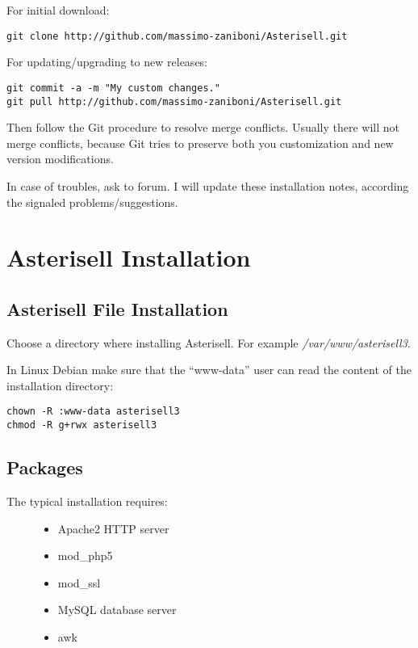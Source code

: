 \documentclass[letterpaper,10pt,english]{sphinxmanual}
\begin{document}
For initial download:

\begin{Verbatim}[commandchars=@\[\]]
git clone http://github.com/massimo-zaniboni/Asterisell.git
\end{Verbatim}

For updating/upgrading to new releases:

\begin{Verbatim}[commandchars=@\[\]]
git commit -a -m "My custom changes."
git pull http://github.com/massimo-zaniboni/Asterisell.git
\end{Verbatim}

Then follow the Git procedure to resolve merge conflicts. Usually there will not merge conflicts, because Git tries to preserve both you customization and new version modifications.

In case of troubles, ask to forum. I will update these installation notes, according the signaled problems/suggestions.


\section{Asterisell Installation}
\label{index:asterisell-installation}

\subsection{Asterisell File Installation}
\label{index:asterisell-file-installation}
Choose a directory where installing Asterisell. For example \emph{/var/www/asterisell3}.

In Linux Debian make sure that the ``www-data'' user can read the content of the installation directory:

\begin{Verbatim}[commandchars=@\[\]]
chown -R :www-data asterisell3
chmod -R g+rwx asterisell3
\end{Verbatim}


\subsection{Packages}
\label{index:packages}\begin{description}
\item[{The typical installation requires:}] \leavevmode\begin{itemize}
\item {} 
Apache2 HTTP server

\item {} 
mod\_php5

\item {} 
mod\_ssl

\item {} 
MySQL database server

\item {} 
awk

\end{itemize}

\end{description}
\end{document}
